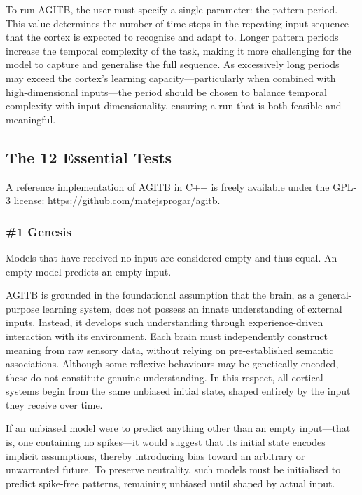 \documentclass{article}
\newenvironment{two_assertions}[2]
{
  \begin{tabular}{p{1.5cm}p{8.2cm}}
    \textbf{Assertion:} & #1 \\
    \textbf{Assertion:} & #2 \\
}{
  \end{tabular}\\
}
\begin{document}
To run AGITB, the user must specify a single parameter: the pattern period. This value determines the number of time steps in the repeating input sequence that the cortex is expected to recognise and adapt to. Longer pattern periods increase the temporal complexity of the task, making it more challenging for the model to capture and generalise the full sequence. As excessively long periods may exceed the cortex’s learning capacity—particularly when combined with high-dimensional inputs—the period should be chosen to balance temporal complexity with input dimensionality, ensuring a run that is both feasible and meaningful.

\subsection{The 12 Essential Tests}

A reference implementation of AGITB in C++ is freely available under the GPL-3 license: \url{https://github.com/matejsprogar/agitb}.

\subsubsection*{\#1 Genesis}
\begin{two_assertions}
    {Models that have received no input are considered empty and thus equal.}
    {An empty model predicts an empty input.}
\end{two_assertions}

AGITB is grounded in the foundational assumption that the brain, as a general-purpose learning system, does not possess an innate understanding of external inputs. Instead, it develops such understanding through experience-driven interaction with its environment. Each brain must independently construct meaning from raw sensory data, without relying on pre-established semantic associations. Although some reflexive behaviours may be genetically encoded, these do not constitute genuine understanding. In this respect, all cortical systems begin from the same unbiased initial state, shaped entirely by the input they receive over time.

If an unbiased model were to predict anything other than an empty input—that is, one containing no spikes—it would suggest that its initial state encodes implicit assumptions, thereby introducing bias toward an arbitrary or unwarranted future. To preserve neutrality, such models must be initialised to predict spike-free patterns, remaining unbiased until shaped by actual input.
\end{document}
